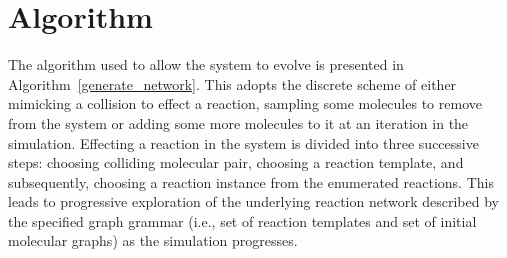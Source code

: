 \section{Algorithm}
\label{sec:algorithm}

The algorithm used to allow the system to evolve is presented in Algorithm~\ref{generate_network}. This adopts the discrete scheme of either mimicking a collision to effect a reaction, sampling some molecules to remove from the system or adding some more molecules to it at an iteration in the simulation. 
Effecting a reaction in the system is divided into three successive steps: choosing colliding molecular pair, choosing a reaction template, and subsequently, choosing a reaction instance from the enumerated reactions.
This leads to progressive exploration of the underlying reaction network described by the specified graph grammar (i.e., set of reaction templates and set of initial molecular graphs) as the simulation progresses.

